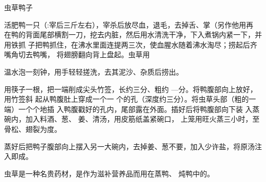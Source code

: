 \begin{recipe}{虫草鸭子}

\ingredients


\preparation

\step 活肥鸭一只（:宰后三斤左右），宰杀后放尽血，退毛，去掉舌、掌（另作他用再
在鸭的背面尾部横割一刀，挖去内脏，然后用水清洗干净，下入煮锅内紧一下，并用铁抓
子把鸭抓住，在沸水里面连提两三次，使血腥水随着沸水淘尽；捞起后齐嘴角切去鸭嘴，
将翅膀翻向背上盘起。虫草用

温水泡一刻钟，用手轻轻搓洗，去其泥沙、杂质后捞出。

用筷子一根，把一端削成尖头竹签，长约三分、粗约 —分。将鸭腹部向上放好，用竹签斜
起从鸭腹肚上穿成一个一 个的孔（深度约三分）。将虫草头部（粗的一端）一个个地插
入鸭腹戳好的孔内，尾部露在外面。插好后将鸭腹部向下装 入蒸碗内，加入料酒、葱、
姜、清汤，用皮筋纸盖紧碗口， 上笼用旺火蒸三小时，至骨松、翅裂为度。

\step 蒸好后把鸭子腹部向上摆入另一大碗内，去掉姜、葱不要，加入少许盐，将原汤注
入即成。

\features

虫草是一种名贵药材，是作为滋补营养品而用在蒸鸭、 炖鸭中的。

\end{recipe}


